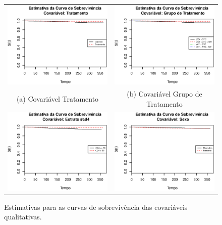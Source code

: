 \documentclass[
	12pt,				%
	openright,			%
	twoside,			%
	a4paper,			%
	english,			%
	brazil				%
	]{abntex2}
\begin{document}
\begin{figure}[!ht]
  \caption{Estimativas para as curvas de sobrevivência das covariáveis qualitativas.}
  \begin{tabular}{cc}
    \label{fig:expdif1}
  \includegraphics[width=65mm]{Rplot03} &   \includegraphics[width=65mm]{Rplot04} \\
(a) Covariável Tratamento & (b) Covariável Grupo de Tratamento \\[6pt]
 \includegraphics[width=65mm]{Rplot05} &   \includegraphics[width=65mm]{Rplot06} \\

\end{tabular}
\end{figure}
\end{document}
